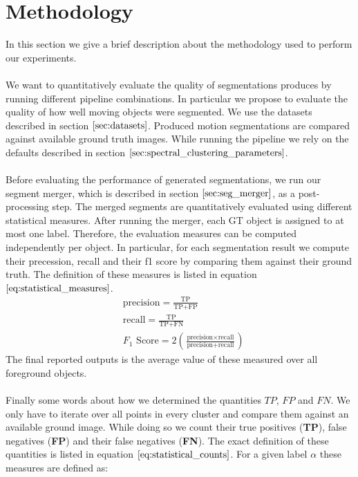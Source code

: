\section{Methodology}
\label{sec:methodology}
In this section we give a brief description about the methodology used to perform our experiments. \\ \\
We want to quantitatively evaluate the quality of segmentations produces by running different pipeline combinations. In particular we propose to evaluate the quality of how well moving objects were segmented. We use the datasets described in section $\ref{sec:datasets}$. Produced motion segmentations are compared against available ground truth images. While running the pipeline we rely on the defaults described in section $\ref{sec:spectral_clustering_parameters}$.\\ \\
Before evaluating the performance of generated segmentations, we run our segment merger, which is described in section $\ref{sec:seg_merger}$, as a post-processing step. The merged segments are quantitatively evaluated using different statistical measures. After running the merger, each GT object is assigned to at most one label. Therefore, the evaluation measures can be computed independently per object. In particular, for each segmentation result we compute their precession, recall and their f1 score by comparing them against their ground truth. The definition of these measures is listed in equation $\ref{eq:statistical_measures}$. 
\begin{equation}
\begin{aligned}
	& \text{precision} = \frac{\text{TP}}{\text{TP} + \text{FP}} \\
	& \text{recall} = \frac{\text{TP}}{\text{TP} + \text{FN}} \\
	& F_1 \text{ Score} = 2 \left( \frac{\text{precision} \times \text{recall}}{\text{precision} +\text{recall}} \right)
\end{aligned}
\label{eq:statistical_measures}
\end{equation}
The final reported outputs is the average value of these measured over all foreground objects. \\ \\
Finally some words about how we determined the quantities $TP$, $FP$ and $FN$. We only have to iterate over all points in every cluster and compare them against an available ground image. While doing so we count their true positives (\textbf{TP}), false negatives (\textbf{FP}) and their false negatives (\textbf{FN}). The exact definition of these quantities is listed in equation $\ref{eq:statistical_counts}$. For a given label $\alpha$ these measures are defined as:
